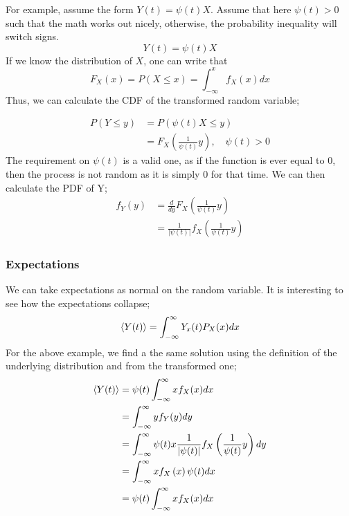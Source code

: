  For example, assume the form $Y(t) = \psi(t)X$. Assume that here $\psi(t) > 0$ such that the math works out nicely, otherwise, the probability inequality will switch signs. 
 \begin{equation}
 	Y(t) = \psi(t)X
 \end{equation}
 If we know the distribution of $X$, one can write that
 \begin{equation}
 	F_X(x) = P(X \leq x) = \int_{-\infty}^x f_X(x)dx
 \end{equation}
 Thus, we can calculate the CDF of the transformed random variable;
 
 \begin{align*}
 	P(Y \leq y) &= P(\psi(t) X \leq y) \\
 	&= F_X\left(\frac{1}{\psi(t)}y\right), \quad \psi(t) > 0
 \end{align*}
The requirement on $\psi(t)$ is a valid one, as if the function is ever equal to 0, then the process is not random as it is simply 0 for that time. We can then calculate the PDF of Y;
\begin{align*}
	f_Y(y) &= \frac{d}{dy} F_X\left(\frac{1}{\psi(t)} y\right)\\
	&= \frac{1}{|\psi(t)|} f_X\left(\frac{1}{\psi(t)} y\right)
\end{align*}

\subsubsection{Expectations}
We can take expectations as normal on the random variable. It is interesting to see how the expectations collapse;
\begin{equation}
	\left\langle{Y(t)}\right\rangle = \int_{-\infty}^{\infty}Y_x(t) P_X(x)dx
\end{equation}
For the above example, we find a the same solution using the definition of the underlying distribution and from the transformed one;
\begin{align*}
	\left\langle{Y(t)}\right\rangle &= \psi(t)\int_{-\infty}^{\infty}x f_X(x)dx \\
	&= \int_{-\infty}^{\infty} yf_Y(y)dy \\
	&= \int_{-\infty}^{\infty} \psi(t) x  \frac{1}{|\psi(t)|} f_X\left(\frac{1}{\psi(t)} y\right) dy \\
	&= \int_{-\infty}^{\infty} x  f_X\left(x\right) \psi(t) dx \\
	&= \psi(t)\int_{-\infty}^{\infty}x f_X(x)dx \\
\end{align*}


